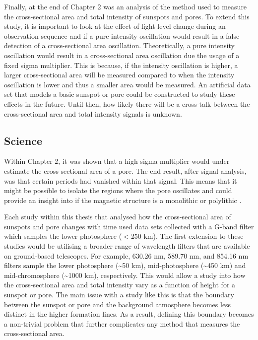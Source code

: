     Finally, at the end of Chapter 2 was an analysis of the method used to measure the cross-sectional area and total intensity of sunspots and pores.
    To extend this study, it is important to look at the effect of light level change during an observation sequence and if a pure intensity oscillation would result in a false detection of a cross-sectional area oscillation. 
    Theoretically, a pure intensity oscillation would result in a cross-sectional area oscillation due the usage of a fixed sigma multiplier.
    This is because, if the intensity oscillation is higher, a larger cross-sectional area will be measured compared to when the intensity oscillation is lower and thus a smaller area would be measured.
    An artificial data set that models a basic sunspot or pore could be constructed to study these effects in the future.  
    Until then, how likely there will be a cross-talk between the cross-sectional area and total intensity signals is unknown.
                
    \subsection{Science}
 
	Within Chapter 2, it was shown that a high sigma multiplier would under estimate the cross-sectional area of a pore.
	The end result, after signal analysis, was that certain periods had vanished within that signal.
	This means that it might be possible to isolate the regions where the pore oscillates and could provide an insight into if the magnetic structure is a monolithic or polylithic \citep{1979ApJ...230..905P}.
 
    Each study within this thesis that analysed how the cross-sectional area of sunspots and pore changes with time used data sets collected with a G-band filter which samples the lower photosphere ($<$250 km).
    The first extension to these studies would be utilising a broader range of wavelength filters that are available on ground-based telescopes.    
    For example,  630.26 nm,  589.70 nm, and  854.16 nm filters sample the lower photosphere (\textasciitilde50 km), mid-photosphere (\textasciitilde 450 km) and mid-chromosphere (\textasciitilde1000 km), respectively.
    This would allow a study into how the cross-sectional area and total intensity vary as a function of height for a sunspot or pore. 
    The main issue with a study like this is that the boundary between the sunspot or pore and the background atmosphere becomes less distinct in the higher formation lines.
    As a result, defining this boundary becomes a non-trivial problem that further complicates any method that measures the cross-sectional area.

